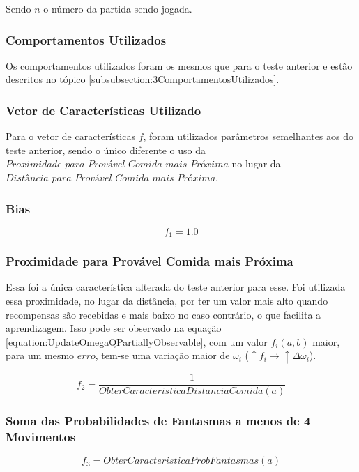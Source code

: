 Sendo $ n $ o número da partida sendo jogada.

\subsubsection{Comportamentos Utilizados}

Os comportamentos utilizados foram os mesmos que para o teste anterior e estão descritos no tópico \ref{subsubsection:3ComportamentosUtilizados}.

\subsubsection{Vetor de Características Utilizado}

Para o vetor de características $ f $, foram utilizados parâmetros semelhantes aos do teste anterior, sendo o único diferente o uso da $ \textit{Proximidade para Provável Comida mais Próxima} $ no lugar da $ \textit{Distância para Provável Comida mais Próxima} $.

\subsubsection*{Bias}

$$ f_1 = 1.0 $$

\subsubsection*{Proximidade para Provável Comida mais Próxima}

Essa foi a única característica alterada do teste anterior para esse. Foi utilizada essa proximidade, no lugar da distância, por ter um valor mais alto quando recompensas são recebidas e mais baixo no caso contrário, o que facilita a aprendizagem. Isso pode ser observado na equação \ref{equation:UpdateOmegaQPartiallyObservable}, com um valor $ f_i \left( a, b \right) $ maior, para um mesmo $ erro $, tem-se uma variação maior de $ \omega_i $ ($ \uparrow f_i \rightarrow \uparrow \Delta \omega_i $).

$$ f_2 = \frac{1}{ObterCaracteristicaDistanciaComida \left( a \right) } $$

\subsubsection*{Soma das Probabilidades de Fantasmas a menos de 4 Movimentos}

$$ f_3 = ObterCaracteristicaProbFantasmas \left( a \right) $$

